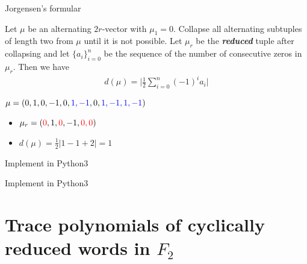 \documentclass[aspectratio={169}]{beamer}
\begin{document}
\begin{frame}{Jorgensen's formular}
\begin{lemma}
Let $\mu$ be an alternating $2r$-vector with $\mu_1 = 0$.
Collapse all alternating subtuples of length two from $\mu$ until it is not possible. 
Let $\mu_r$ be the \textbf{\textit{reduced}} tuple after collapsing
and let $\{a_i\}_{i=0}^n$ be the sequence of the number of consecutive zeros in $\mu_r$. Then we have
\begin{align*}
     d(\mu) = \Big| \frac{1}{2}\sum_{i=0}^{n}{(-1)^i a_i} \Big|
\end{align*}
\end{lemma}
\vskip 0.3cm
$\mu = (0,1,0,-1,0,\textcolor{blue}{1,-1},0,\textcolor{blue}{1,-1,1,-1})$
\pause
\begin{itemize}
[boldarrow]
    \item $\mu_r = (\textcolor{red}{0},1,\textcolor{red}{0},-1,\textcolor{red}{0,0})$
    \item $d(\mu) = \frac{1}{2}|1 -1 + 2| = 1$
\end{itemize}
\end{frame}
\begin{frame}{Implement in Python3}
\tiny{

}
\end{frame}
\begin{frame}{Implement in Python3}
\tiny{

}
\end{frame}
\begin{frame}
\begin{figure}[h]
\begin{subfigure}
\texttt{[image: images/computation.png]}
\end{subfigure}
\begin{subfigure}
\texttt{[image: images/table.JPG]} 
\end{subfigure}
\end{figure}
\end{frame}

\section{Trace polynomials of cyclically reduced words in $F_2$}
\end{document}

